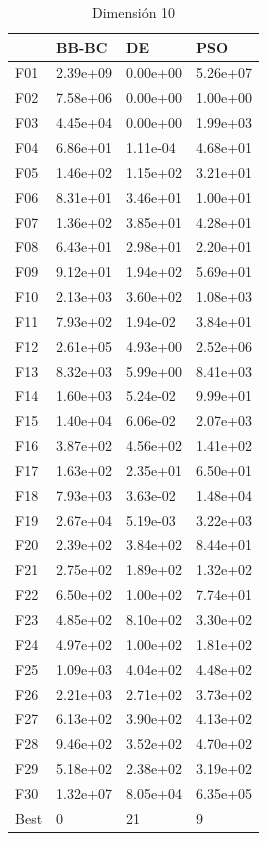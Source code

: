 \begin{table}[H]
    \begin{minipage}{.5\linewidth}
      \caption{Dimensión 10}
      \centering
      \begin{tabular}{llll}
        \toprule
        {} &     BB-BC &        DE &       PSO \\
        \midrule
        F01  &  2.39e+09 &  0.00e+00 &  5.26e+07 \\
        F02  &  7.58e+06 &  0.00e+00 &  1.00e+00 \\
        F03  &  4.45e+04 &  0.00e+00 &  1.99e+03 \\
        F04  &  6.86e+01 &  1.11e-04 &  4.68e+01 \\
        F05  &  1.46e+02 &  1.15e+02 &  3.21e+01 \\
        F06  &  8.31e+01 &  3.46e+01 &  1.00e+01 \\
        F07  &  1.36e+02 &  3.85e+01 &  4.28e+01 \\
        F08  &  6.43e+01 &  2.98e+01 &  2.20e+01 \\
        F09  &  9.12e+01 &  1.94e+02 &  5.69e+01 \\
        F10  &  2.13e+03 &  3.60e+02 &  1.08e+03 \\
        F11  &  7.93e+02 &  1.94e-02 &  3.84e+01 \\
        F12  &  2.61e+05 &  4.93e+00 &  2.52e+06 \\
        F13  &  8.32e+03 &  5.99e+00 &  8.41e+03 \\
        F14  &  1.60e+03 &  5.24e-02 &  9.99e+01 \\
        F15  &  1.40e+04 &  6.06e-02 &  2.07e+03 \\
        F16  &  3.87e+02 &  4.56e+02 &  1.41e+02 \\
        F17  &  1.63e+02 &  2.35e+01 &  6.50e+01 \\
        F18  &  7.93e+03 &  3.63e-02 &  1.48e+04 \\
        F19  &  2.67e+04 &  5.19e-03 &  3.22e+03 \\
        F20  &  2.39e+02 &  3.84e+02 &  8.44e+01 \\
        F21  &  2.75e+02 &  1.89e+02 &  1.32e+02 \\
        F22  &  6.50e+02 &  1.00e+02 &  7.74e+01 \\
        F23  &  4.85e+02 &  8.10e+02 &  3.30e+02 \\
        F24  &  4.97e+02 &  1.00e+02 &  1.81e+02 \\
        F25  &  1.09e+03 &  4.04e+02 &  4.48e+02 \\
        F26  &  2.21e+03 &  2.71e+02 &  3.73e+02 \\
        F27  &  6.13e+02 &  3.90e+02 &  4.13e+02 \\
        F28  &  9.46e+02 &  3.52e+02 &  4.70e+02 \\
        F29  &  5.18e+02 &  2.38e+02 &  3.19e+02 \\
        F30  &  1.32e+07 &  8.05e+04 &  6.35e+05 \\
        Best &         0 &        21 &         9 \\
        \bottomrule
        \end{tabular}
        

\end{minipage}
\end{table}
